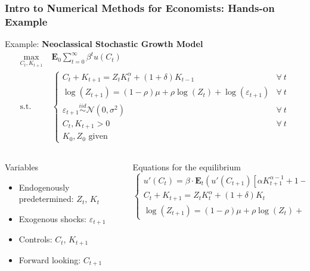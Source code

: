 \documentclass[10pt, aspectratio=1610]{beamer}
\newcommand{\E}{\mathbf{E}}
\begin{document}
  \begin{frame}
    \frametitle{Intro to Numerical Methods for Economists: Hands-on Example}

    Example: \textbf{Neoclassical Stochastic Growth Model}
    \begin{align*}
      \max_{C_t, K_{t+1}} &\; \E_0 \sum_{t=0}^{\infty} \beta^t u(C_t) \\
      \text{s.t.} &\; \begin{cases}
        C_t + K_{t+1} = Z_t K_t^\alpha + (1 + \delta) K_{t-1} &\forall\ t\\
        \log(Z_{t+1}) = (1-\rho) \mu + \rho \log(Z_t) + \log(\varepsilon_{t+1}) &\forall\ t\\
        \varepsilon_{t+1} \overset{iid}{\sim} \mathcal{N}(0, \sigma^2) &\forall\ t\\
        C_t, K_{t+1} > 0 &\forall\ t\\
        K_{0}, Z_{0} \text{ given}
      \end{cases}
    \end{align*}

    \vfill\pause

    \begin{columns}[T]
      \begin{column}{0.475\textwidth}
        Variables
        \begin{itemize}
          \item Endogenously predetermined: $Z_t$, $K_t$
          \item Exogenous shocks: $\varepsilon_{t+1}$
          \item Controls: $C_t$, $K_{t+1}$
          \item Forward looking: $C_{t+1}$
        \end{itemize}
      \end{column}
      \begin{column}{0.475\textwidth}
        Equations for the equilibrium
        \begin{equation*}
          \begin{cases}
            u'(C_t) = \beta \cdot \E_t \left( u'(C_{t+1}) \left[ \alpha K_{t+1}^{\alpha-1} + 1 - \delta \right] \right) \\
            C_t + K_{t+1} = Z_t K_t^\alpha + (1 + \delta) K_t  \\
            \log(Z_{t+1}) = (1-\rho) \mu + \rho \log(Z_t) + \log(\varepsilon_{t+1})
          \end{cases}
        \end{equation*}
      \end{column}
    \end{columns}

  \end{frame}
\end{document}
